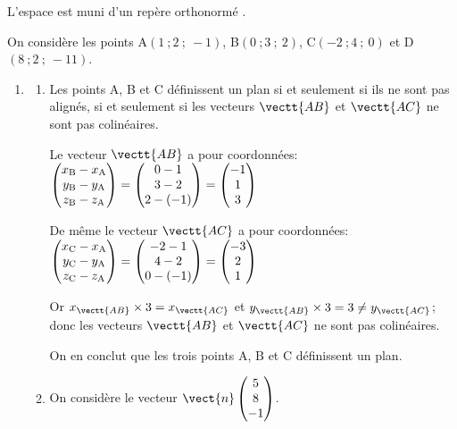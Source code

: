 L'espace est muni d'un repère orthonormé \Oij.

On considère les points A$(1~;2~;~-1)$, B$(0~;3~;~2)$, C$(-2~;4~;~0)$ et D$(8~;2~;~-11)$.

\begin{enumerate}
\item
\begin{enumerate}[label=\textbf{\alph*.}]
\item 
Les points A, B et C définissent un plan si et seulement si ils ne sont pas alignés, si et seulement si les vecteurs $\vectt{AB}$ et $\vectt{AC}$ ne sont pas colinéaires.

Le vecteur $\vectt{AB}$ a pour coordonnées: 
$\begin{pmatrix}
x_{\text B} - x_{\text A} \\ y_{\text B} - y_{\text A} \\ z_{\text B} - z_{\text A}
\end{pmatrix}
=
\begin{pmatrix}
0 - 1 \\ 3-2 \\ 2-(-1) 
\end{pmatrix}
=
\begin{pmatrix}
-1 \\ 1 \\3
\end{pmatrix}$

De même le vecteur $\vectt{AC}$ a pour coordonnées: 
$\begin{pmatrix}
x_{\text C} - x_{\text A} \\ y_{\text C} - y_{\text A} \\ z_{\text C} - z_{\text A}
\end{pmatrix}
=
\begin{pmatrix}
-2-1 \\ 4-2 \\ 0-(-1)
\end{pmatrix}
=
\begin{pmatrix}
-3 \\ 2 \\ 1
\end{pmatrix}$

Or $x_{\vectt{AB}} \times 3 = x_{\vectt{AC}}$ et $y_{\vectt{AB}} \times 3 = 3 \neq y_{\vectt{AC}}$; donc les vecteurs $\vectt{AB}$ et $\vectt{AC}$ ne sont pas colinéaires.

On en conclut que les trois points A, B et C définissent un plan.  

\item
On considère le vecteur $\vect{n}\begin{pmatrix}5\\8\\-1\end{pmatrix}$.


\end{enumerate}
\end{enumerate}
